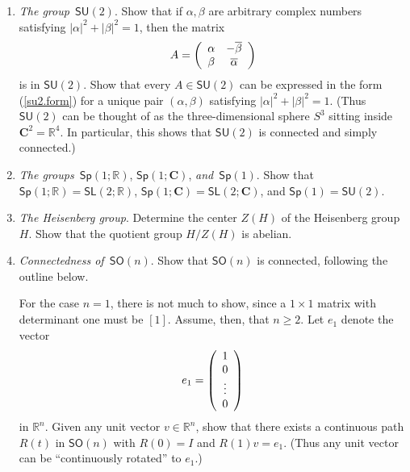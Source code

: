 \documentclass{amsbook}
\theoremstyle{plain}
\numberwithin{equation}{chapter}
\numberwithin{theorem}{chapter}
\begin{document}
\begin{enumerate}
\item \label{su2}\textit{The group}\emph{\ }$\mathsf{SU}(2)$. Show that if
$\alpha,\beta$ are arbitrary complex numbers satisfying $\left|
\alpha\right|  ^{2}+\left|  \beta\right|  ^{2}=1$, then the matrix
\begin{equation}
A=\left(
\begin{array}
[c]{cc}%
\alpha & -\overline{\beta}\\
\beta & \overline{\alpha}%
\end{array}
\right)  \label{su2.form}%
\end{equation}
is in $\mathsf{SU}(2)$. Show that every $A\in\mathsf{SU}(2)$ can be expressed
in the form (\ref{su2.form}) for a unique pair $(\alpha,\beta)$ satisfying
$\left|  \alpha\right|  ^{2}+\left|  \beta\right|  ^{2}=1$. (Thus
$\mathsf{SU}(2)$ can be thought of as the three-dimensional sphere $S^{3}$
sitting inside $\mathbf{C}^{2}=\mathbb{R}^{4}$. In particular, this shows that
$\mathsf{SU}(2)$ is connected and simply connected.)

\item \label{sp1}\textit{The groups}\emph{\ }$\mathsf{Sp}\left(
1;\mathbb{R}\right)  $, $\mathsf{Sp}\left(  1;\mathbf{C}\right)  $,
\textit{and}\emph{\ }$\mathsf{Sp}\left(  1\right)  $. Show that $\mathsf{Sp}%
\left(  1;\mathbb{R}\right)  =\mathsf{SL}\left(  2;\mathbb{R}\right)  $,
$\mathsf{Sp}\left(  1;\mathbf{C}\right)  =\mathsf{SL}\left(  2;\mathbf{C}%
\right)  $, and $\mathsf{Sp}(1)=\mathsf{SU}(2)$.

\item \label{heisenberg.center}\textit{The Heisenberg group}. Determine the
center $Z(H)$ of the Heisenberg group $H$. Show that the quotient group
$H/Z(H)$ is abelian.

\item \label{connect.son}\textit{Connectedness of}\emph{\ }$\mathsf{SO}(n)$.
Show that $\mathsf{SO}(n)$ is connected, following the outline below.

For the case $n=1$, there is not much to show, since a $1\times1$ matrix with
determinant one must be $\left[  1\right]  $. Assume, then, that $n\geq2$. Let
$e_{1}$ denote the vector
\[
e_{1}=\left(
\begin{array}
[c]{c}%
1\\
0\\
\vdots\\
0
\end{array}
\right)
\]
in $\mathbb{R}^{n}$. Given any unit vector $v\in\mathbb{R}^{n}$, show that
there exists a continuous path $R(t)$ in $\mathsf{SO}(n)$ with $R(0)=I$ and
$R(1)v=e_{1}$. (Thus any unit vector can be ``continuously rotated'' to
$e_{1}$.)


\end{enumerate}
\end{document}
